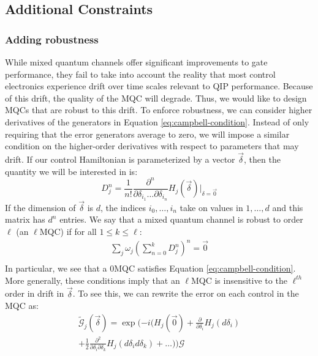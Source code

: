 \documentclass[aps,nofootinbib,pra,notitlepage,twocolumn]{revtex4-1}
\newcommand{\actual}{\ensuremath{\tilde{\mathcal{G}}}}
\newcommand{\target}{\ensuremath{{\mathcal{G}}}}
\begin{document}
\subsection{Additional Constraints}
\subsubsection{Adding robustness} %
\label{sub:adding_robustness}
While mixed quantum channels offer significant improvements to gate performance, they fail to take into account the reality that most control electronics experience drift over time scales relevant to QIP performance. Because of this drift, the quality of the MQC will degrade. Thus, we would like to design MQCs that are robust to this drift. To enforce robustness, we can consider higher derivatives of the generators in Equation \ref{eq:campbell-condition}. Instead of only requiring that the error generators average to zero, we will impose a similar condition on the higher-order derivatives with respect to parameters that may drift. If our control Hamiltonian is parameterized by a vector $\vec{\delta}$, then the quantity we will be interested in is:
\begin{equation}
D^n_j = \frac{1}{n!}\frac{\partial^{n}}{\partial\delta_{i_1}\ldots\partial\delta_{i_n}}H_j(\vec{\delta})|_{\delta=\vec{0}}
\end{equation}
If the dimension of $\vec{\delta}$ is $d$, the indices $i_0, \ldots, i_n$ take on values in $1, \ldots, d$ and this matrix has $d^n$ entries. 
We say that a mixed quantum channel is robust to order $\ell$ (an $\ell$MQC) if for all $1 \leq k \leq \ell$:
\begin{equation}\label{eq:MQC}
\begin{gathered}
\sum_j\omega_j(\sum_{n=0}^k D^n_j)^n = \vec{0}\\
\end{gathered}
\end{equation}
In particular, we see that a 0MQC satisfies Equation \ref{eq:campbell-condition}. More generally, these conditions imply that an $\ell$MQC is insensitive to the $\ell^{th}$ order in drift in $\vec{\delta}$. To see this, we can rewrite the error on each control in the MQC as:
\begin{equation}\label{eq:taylor}
\begin{gathered}
\actual_j(\vec{\delta}) = \exp(-i(H_j(\vec{0}) + \frac{\partial}{\partial\delta_i}H_j(d\delta_i)\\ +  \frac{1}{2}\frac{\partial^2}{\partial\delta_i\partial\delta_k} H_j(d\delta_i d\delta_k) + \ldots))\target
\end{gathered}
\end{equation}
\end{document}
